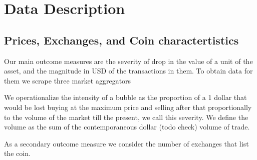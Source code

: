 \section{Data Description}

\subsection{Prices, Exchanges, and Coin charactertistics}



Our main outcome measures are the severity of drop in the value of a unit of the asset, and the magnitude in USD of the transactions in them.
To obtain data for them we scrape three market aggregators 

We operationalize the intensity of a bubble as the proportion of a 1 dollar that would be lost buying at the maximum price and selling after that proportionally to the volume of the market till the present, we call this severity.
We define the volume as the sum of the contemporaneous dollar (todo check) volume of trade.

As a secondary outcome measure we consider the number of exchanges that list the coin.
